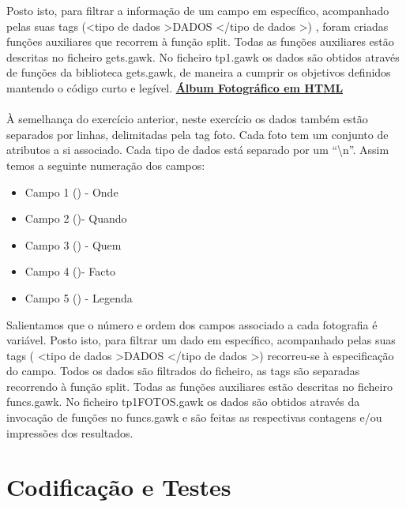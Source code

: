 \documentclass{report}
\begin{document}
Posto isto, para filtrar a informa\c{c}\~ao de um campo em específico, acompanhado pelas suas tags (\textless tipo de dados \textgreater DADOS \textless /tipo de dados \textgreater) , foram criadas fun\c{c}\~oes auxiliares que recorrem à fun\c{c}\~ao split. Todas as fun\c{c}\~oes auxiliares est\~ao descritas no ficheiro gets.gawk. No ficheiro tp1.gawk os dados s\~ao obtidos através de fun\c{c}\~oes da biblioteca gets.gawk, de maneira a cumprir os objetivos definidos mantendo o código curto e legível.
\newpage
\textbf{\underline{Álbum Fotográfico em HTML}}
\\
\\
À semelhan\c{c}a do exercício anterior, neste exercício os dados também est\~ao separados por linhas, delimitadas pela tag foto. Cada foto tem um conjunto de atributos a si associado. Cada tipo de dados está separado por um “\textbackslash n”. Assim temos a seguinte numera\c{c}\~ao dos campos:
\\
\begin{itemize}
    \item Campo 1 () - Onde
    \item Campo 2 ()- Quando
    \item Campo 3 () - Quem
    \item Campo 4 ()- Facto
    \item Campo 5 () - Legenda
\end{itemize}
Salientamos que o número e ordem dos campos associado a cada fotografia é variável.
Posto isto, para filtrar um dado em específico, acompanhado pelas suas tags ( \textless tipo de dados  \textgreater  DADOS  \textless /tipo de dados  \textgreater ) recorreu-se à especifica\c{c}\~ao do campo. Todos os dados s\~ao filtrados do ficheiro, as tags s\~ao separadas recorrendo à fun\c{c}\~ao split. Todas as fun\c{c}\~oes auxiliares est\~ao descritas no ficheiro funcs.gawk. No ficheiro tp1FOTOS.gawk os dados s\~ao obtidos através da invoca\c{c}\~ao de fun\c{c}\~oes no funcs.gawk e s\~ao feitas as respectivas contagens e/ou impress\~oes dos resultados.
\\
\chapter{Codificação e Testes}
\end{document}
